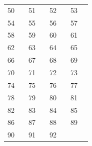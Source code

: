 \begin{center}
\begin{tabular}{*{8}{c}}
50 & \pageref{op:50} & 51 & \pageref{op:51} & 52 & \pageref{op:52} & 53 & \pageref{op:53}\\
54 & \pageref{op:54} & 55 & \pageref{op:55} & 56 & \pageref{op:56} & 57 & \pageref{op:57}\\
58 & \pageref{op:58} & 59 & \pageref{op:59} & 60 & \pageref{op:60} & 61 & \pageref{op:61}\\
62 & \pageref{op:62} & 63 & \pageref{op:63} & 64 & \pageref{op:64} & 65 & \pageref{op:65}\\
66 & \pageref{op:66} & 67 & \pageref{op:67} & 68 & \pageref{op:68} & 69 & \pageref{op:69}\\
70 & \pageref{op:70} & 71 & \pageref{op:71} & 72 & \pageref{op:72} & 73 & \pageref{op:73}\\
74 & \pageref{op:74} & 75 & \pageref{op:75} & 76 & \pageref{op:76} & 77 & \pageref{op:77}\\
78 & \pageref{op:78} & 79 & \pageref{op:79} & 80 & \pageref{op:80} & 81 & \pageref{op:81}\\
82 & \pageref{op:82} & 83 & \pageref{op:83} & 84 & \pageref{op:84} & 85 & \pageref{op:85}\\
86 & \pageref{op:86} & 87 & \pageref{op:87} & 88 & \pageref{op:88} & 89 & \pageref{op:89}\\
90 & \pageref{op:90} & 91 & \pageref{op:91} & 92 & \pageref{op:92} &  & \\
\bottomrule
\end{tabular}
\end{center}
